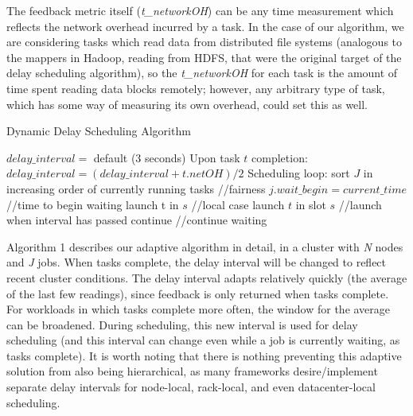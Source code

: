 \documentclass[10pt,conference,compsocconf,letterpaper]{IEEEtran}
\begin{document}
The feedback metric itself (\textit{t\_networkOH}) can be any time measurement which 
reflects the network overhead incurred by a task. In the case of our algorithm, we are 
considering tasks which read data from distributed file systems (analogous to the mappers 
in Hadoop, reading from HDFS, that were the original target of the delay scheduling 
algorithm), so the \textit{t\_networkOH} for each task is the amount of time spent 
reading data blocks remotely; however, any arbitrary type of task, which has some way of 
measuring its own overhead, could set this as well.

\begin{algorithm}
\footnotesize
\caption{Dynamic Delay Scheduling Algorithm}
\begin{algorithmic}[1]
\State $delay\_interval =$ default (3 seconds)
\State  
\State Upon task $t$ completion:
\State $delay\_interval = (delay\_interval + t.netOH) / 2$
\State
\State Scheduling loop:
    \State sort $J$ in increasing order of currently running tasks  //fairness
            \State $j.wait\_begin = current\_time$  //time to begin waiting
        \EndIf
            \State launch t in $s$      //local case
        \Else {}
                \State launch $t$ in slot $s$   //launch when interval has passed
            \Else
                \State continue     //continue waiting
            \EndIf
            \EndIf
        \EndIf
    \EndFor
\EndFor
\end{algorithmic}
\end{algorithm}

Algorithm 1 describes our adaptive algorithm in detail, in a cluster with \textit{N} nodes and \textit{J} jobs. When tasks complete, the delay interval will be changed to reflect 
recent cluster conditions. The delay interval adapts relatively quickly (the average of
the last few readings), since feedback is only returned when tasks complete. For workloads
in which tasks complete more often, the window for the average can be broadened. 
During scheduling, this new interval is used for delay scheduling (and this interval can 
change even while a job is currently waiting, as tasks complete). It is worth noting that 
there is nothing preventing this adaptive solution from also being hierarchical, as many 
frameworks desire/implement separate delay intervals for node-local, rack-local, and even 
datacenter-local scheduling.
\end{document}

